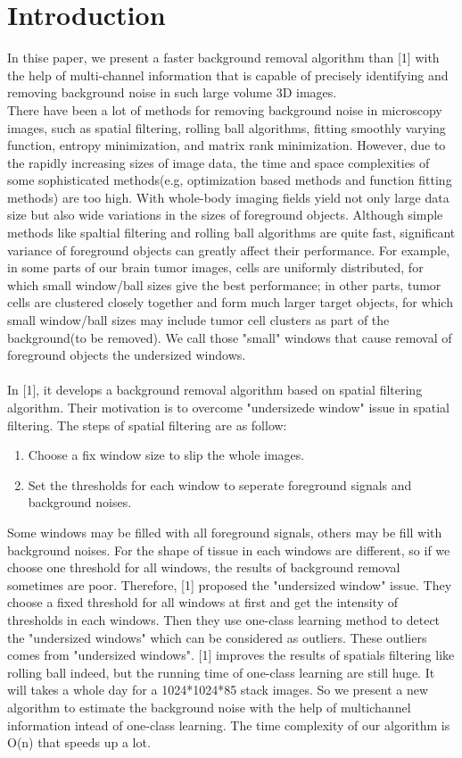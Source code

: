 \documentclass{article}
\begin{document}
\section{Introduction}
\label{sec:intro}
 In thise paper, we present a faster background removal algorithm than [1]  with the help of multi-channel information that is capable of precisely identifying and removing background noise in such large volume 3D images.\\
	There have been a lot of methods for removing background noise in microscopy images, such as spatial filtering, rolling ball algorithms, fitting smoothly varying function, entropy minimization, and matrix rank minimization. However, due to the rapidly increasing sizes of image data, the time and space complexities of some sophisticated methods(e.g, optimization based methods and function fitting methods) are too high. With whole-body imaging fields yield not only large data size but also wide variations in the sizes of foreground objects. Although simple methods like spaltial filtering and rolling ball algorithms are quite fast, significant variance of foreground objects can greatly affect their performance. For example, in some parts of our brain tumor images, cells are uniformly distributed, for which small window/ball sizes give the best performance; in other parts, tumor cells are clustered closely together and form much larger target objects, for which small window/ball sizes may include tumor cell clusters as part of the background(to be removed). We call those "small" windows that cause removal of foreground objects the undersized windows.\\
	\\
	In [1], it develops a background removal algorithm based on spatial filtering algorithm. Their motivation is to overcome "undersizede window" issue in spatial filtering. The steps of  spatial filtering are as follow:
	\begin{enumerate}
		\item Choose a fix window size to slip the whole images.
		\item Set the thresholds for each window to seperate foreground signals and background noises.
	\end{enumerate}
	Some windows may be filled with all foreground signals, others may be fill with background noises.
	For the shape of tissue in each windows are different, so if we choose one threshold for all windows, the results of background removal sometimes are poor. Therefore, [1] proposed the "undersized window" issue. They choose a fixed threshold for all windows at first and get the intensity of thresholds in each windows. Then they use one-class learning method to detect the "undersized windows" which can be considered as outliers. These outliers comes from "undersized windows".
	[1] improves the results of spatials filtering like rolling ball indeed, but the running time of one-class learning are still huge. It will takes a whole day for a 1024*1024*85 stack images. So we present a new algorithm to estimate the background noise with the help of multichannel information intead of one-class learning. The time complexity of our algorithm is O(n) that speeds up a lot.
\end{document}
